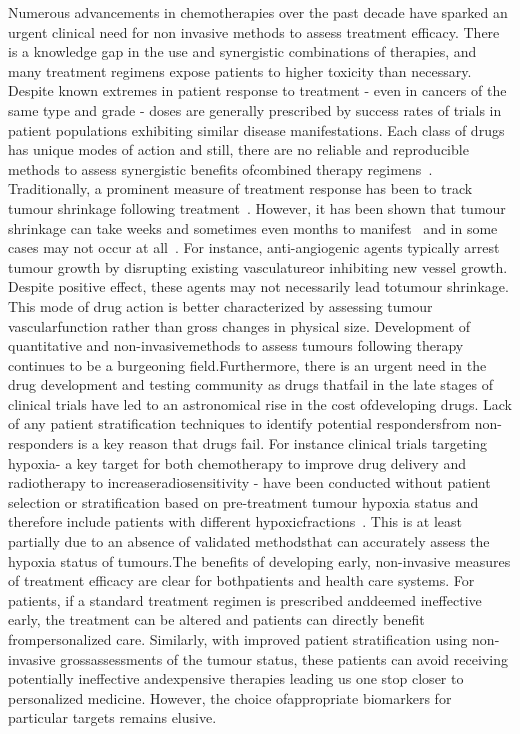 Numerous advancements in chemotherapies over the past decade have sparked an urgent clinical need for non invasive methods to assess treatment efficacy.
There is a knowledge gap in the use and synergistic combinations of therapies, and many treatment regimens expose patients to higher toxicity than necessary.
Despite known extremes in patient response to treatment - even in cancers of the same type and grade - doses are generally prescribed by success rates of trials in patient populations exhibiting similar disease manifestations.
Each class of drugs has unique modes of action and still, there are no reliable and reproducible methods to assess synergistic benefits ofcombined therapy regimens~\cite{Zhang:2008vi}.
Traditionally, a prominent measure of treatment response has been to track tumour shrinkage following treatment~\cite{Tuma:2006hx}.
However, it has been shown that tumour shrinkage can take weeks and sometimes even months to manifest~\cite{Brindle:2008tb} and in some cases may not occur at all~\cite{Kitzen:2008un}.
For instance, anti-angiogenic agents typically arrest tumour growth by disrupting existing vasculatureor inhibiting new vessel growth.
Despite positive effect, these agents may not necessarily lead totumour shrinkage.
This mode of drug action is better characterized by assessing tumour vascularfunction rather than gross changes in physical size.
Development of quantitative and non-invasivemethods to assess tumours following therapy continues to be a burgeoning field.Furthermore, there is an urgent need in the drug development and testing community as drugs thatfail in the late stages of clinical trials have led to an astronomical rise in the cost ofdeveloping drugs.
Lack of any patient stratification techniques to identify potential respondersfrom non-responders is a key reason that drugs fail.
For instance clinical trials targeting hypoxia- a key target for both chemotherapy to improve drug delivery and radiotherapy to increaseradiosensitivity - have been conducted without patient selection or stratification based on pre-treatment tumour hypoxia status and therefore include patients with different hypoxicfractions~\cite{Overgaard:2011ji}.
This is at least partially due to an absence of validated methodsthat can accurately assess the hypoxia status of tumours.The benefits of developing early, non-invasive measures of treatment efficacy are clear for bothpatients and health care systems.
For patients, if a standard treatment regimen is prescribed anddeemed ineffective early, the treatment can be altered and patients can directly benefit frompersonalized care.
Similarly, with improved patient stratification using non-invasive grossassessments of the tumour status, these patients can avoid receiving potentially ineffective andexpensive therapies leading us one stop closer to personalized medicine.
However, the choice ofappropriate biomarkers for particular targets remains elusive. 

